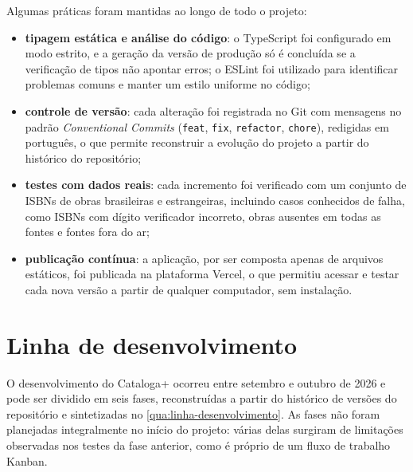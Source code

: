 Algumas práticas foram mantidas ao longo de todo o projeto:

\begin{itemize}
    \item \textbf{tipagem estática e análise do código}: o TypeScript foi configurado em modo estrito, e a geração da versão de produção só é concluída se a verificação de tipos não apontar erros; o ESLint foi utilizado para identificar problemas comuns e manter um estilo uniforme no código;
    \item \textbf{controle de versão}: cada alteração foi registrada no Git com mensagens no padrão \textit{Conventional Commits} (\texttt{feat}, \texttt{fix}, \texttt{refactor}, \texttt{chore}), redigidas em português, o que permite reconstruir a evolução do projeto a partir do histórico do repositório;
    \item \textbf{testes com dados reais}: cada incremento foi verificado com um conjunto de ISBNs de obras brasileiras e estrangeiras, incluindo casos conhecidos de falha, como ISBNs com dígito verificador incorreto, obras ausentes em todas as fontes e fontes fora do ar;
    \item \textbf{publicação contínua}: a aplicação, por ser composta apenas de arquivos estáticos, foi publicada na plataforma Vercel, o que permitiu acessar e testar cada nova versão a partir de qualquer computador, sem instalação.
\end{itemize}

\section{Linha de desenvolvimento}
\label{sec:linha-desenvolvimento}

O desenvolvimento do Cataloga+ ocorreu entre setembro e outubro de 2026 e pode ser dividido em seis fases, reconstruídas a partir do histórico de versões do repositório e sintetizadas no \autoref{qua:linha-desenvolvimento}. As fases não foram planejadas integralmente no início do projeto: várias delas surgiram de limitações observadas nos testes da fase anterior, como é próprio de um fluxo de trabalho Kanban.

